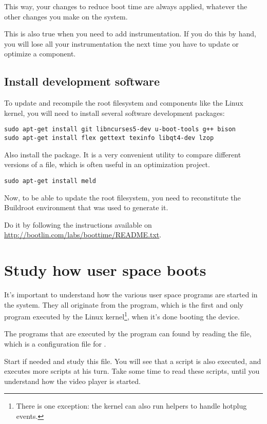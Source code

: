 This way, your changes to reduce boot time are always applied,
whatever the other changes you make on the system.

This is also true when you need to add instrumentation. If you do
this by hand, you will lose all your instrumentation the next
time you have to update or optimize a component.

\subsection{Install development software}

To update and recompile the root filesystem and
components like the Linux kernel, you will need to install several
software development packages:

\begin{verbatim}
sudo apt-get install git libncurses5-dev u-boot-tools g++ bison
sudo apt-get install flex gettext texinfo libqt4-dev lzop
\end{verbatim}

Also install the  package. It is a very
convenient utility to compare different versions of a file, which
is often useful in an optimization project.

\begin{verbatim}
sudo apt-get install meld
\end{verbatim}

Now, to be able to update the root filesystem, you need to reconstitute
the Buildroot environment that was used to generate it. 

Do it by following the instructions available on
\url{http://bootlin.com/labs/boottime/README.txt}.

\section{Study how user space boots}

It's important to understand how the various user space programs
are started in the system. They all originate from the 
program, which is the first and only program executed by the Linux
kernel\footnote{There is one exception: the kernel can also run
helpers to handle hotplug events.}, when it's done booting the device.

The programs that are executed by the  program can
found by reading the  file, which is a configuration
file for .

Start  if needed and study this file. You will see that
a  script is also executed, and executes more
scripts at his turn. Take some time to read these scripts, until you
understand how the video player is started.

